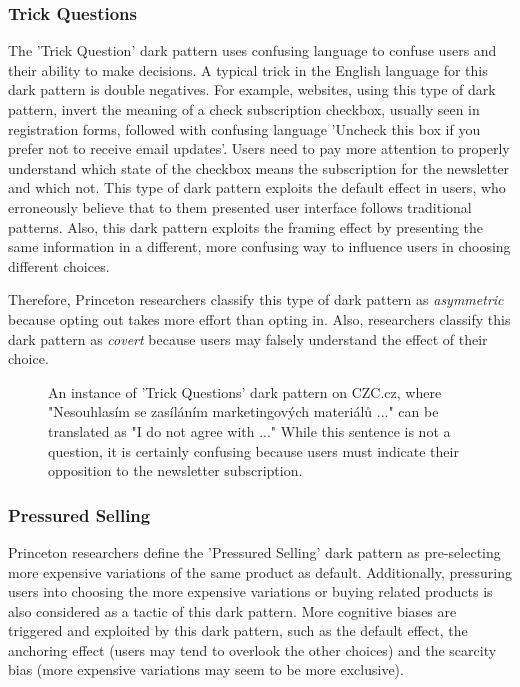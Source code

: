         \subsubsection{Trick Questions}
        The 'Trick Question' dark pattern uses confusing language to confuse users and their ability to make decisions. A typical trick in the English language for this dark pattern is double negatives. For example, websites, using this type of dark pattern, invert the meaning of a check subscription checkbox, usually seen in registration forms, followed with confusing language 'Uncheck this box if you prefer not to receive email updates'. Users need to pay more attention to properly understand which state of the checkbox means the subscription for the newsletter and which not. This type of dark pattern exploits the default effect in users, who erroneously believe that to them presented user interface follows traditional patterns. Also, this dark pattern exploits the framing effect by presenting the same information in a different, more confusing way to influence users in choosing different choices.
        
        Therefore, Princeton researchers classify this type of dark pattern as \emph{asymmetric} because opting out takes more effort than opting in. Also, researchers classify this dark pattern as \emph{covert} because users may falsely understand the effect of their choice.

        \begin{figure}[ht]
            \centering
            \caption{An instance of 'Trick Questions' dark pattern on CZC.cz, where "Nesouhlasím se zasíláním marketingových materiálů ..." can be translated as "I do not agree with ..." While this sentence is not a question, it is certainly confusing because users must indicate their opposition to the newsletter subscription.}
            \label{fig:trick-questions-czc}
        \end{figure}

        \subsubsection{Pressured Selling}
        Princeton researchers define the 'Pressured Selling' dark pattern as pre-selecting more expensive variations of the same product as default. Additionally, pressuring users into choosing the more expensive variations or buying related products is also considered as a tactic of this dark pattern. More cognitive biases are triggered and exploited by this dark pattern, such as the default effect, the anchoring effect (users may tend to overlook the other choices) and the scarcity bias (more expensive variations may seem to be more exclusive).  
        
